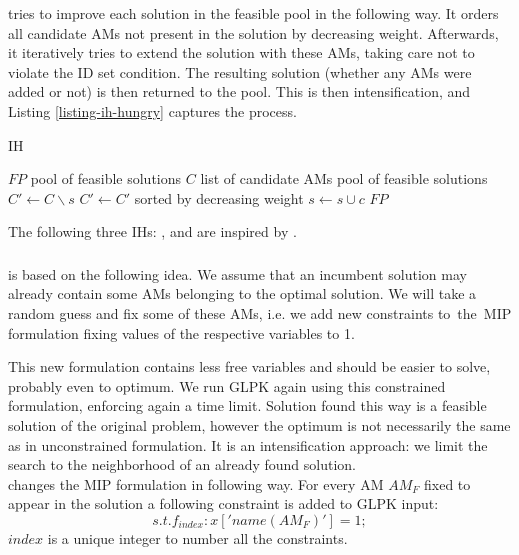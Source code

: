 tries to improve each solution in the feasible pool in the following way. It orders all candidate AMs not present in the solution by decreasing weight. Afterwards, it iteratively tries to extend the solution with these AMs, taking care not to violate the ID set condition. The resulting solution (whether any AMs were added or not) is then returned to the pool. This is then intensification, and Listing \ref{listing-ih-hungry} captures the process.\\

\begin{algorithm}
\caption{ IH}
\label{listing-ih-hungry}
\begin{algorithmic}
\REQUIRE $FP$ pool of feasible solutions
\REQUIRE $C$ list of candidate AMs
\ENSURE pool of feasible solutions
  \STATE {}
  \STATE $C' \gets C \backslash s$
  \STATE $C' \gets C'$ sorted by decreasing weight
      \STATE $s \gets s \cup c$
    \ENDIF
  \ENDFOR
\ENDFOR
\RETURN $FP$
\end{algorithmic}
\end{algorithm}

The following three IHs: ,  and  are inspired by \cite{heu-lecture}.

\subsubsection{}

 is based on the following idea. We assume that an incumbent solution may already contain some AMs belonging to the optimal solution. We will take a random guess and fix some of these AMs, i.e. we add new constraints to~the~MIP formulation fixing values of the respective variables to 1.

This new formulation contains less free variables and should be easier to solve, probably even to optimum. We run GLPK again using this constrained formulation, enforcing again a time limit. Solution found this way is a feasible solution of the original problem, however the optimum is not necessarily the same as in unconstrained formulation. It is an intensification approach: we limit the search to the neighborhood of an already found solution.\\

 changes the MIP formulation in following way. For every AM $AM_F$ fixed to appear in the solution a following constraint is added to GLPK input:
\[s.t. f_{index}: x['name(AM_F)'] = 1;\]
$index$ is a unique integer to number all the constraints.

